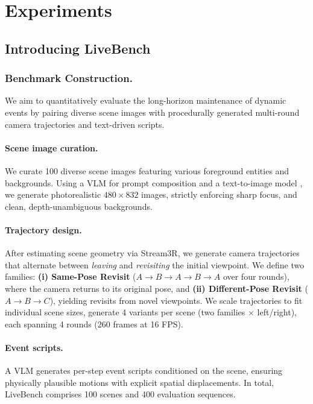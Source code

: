\vspace{-1mm}
\section{Experiments}
\subsection{Introducing LiveBench}
\vspace{-0.5mm}
\subsubsection{Benchmark Construction.}
We aim to quantitatively evaluate the long-horizon maintenance of dynamic events by pairing diverse scene images with procedurally generated multi-round camera trajectories and text-driven scripts.
\vspace{-0.5mm}
\paragraph{Scene image curation.}
We curate 100 diverse scene images featuring various foreground entities and backgrounds. Using a VLM\cite{qwen3vl} for prompt composition and a text-to-image model \cite{qwenimage}, we generate photorealistic $480\times832$ images, strictly enforcing sharp focus, and clean, depth-unambiguous backgrounds.
\vspace{-0.5mm}
\paragraph{Trajectory design.}
After estimating scene geometry via Stream3R\cite{stream3r2025}, we generate camera trajectories that alternate between \emph{leaving} and \emph{revisiting} the initial viewpoint. We define two families: \textbf{(i) Same-Pose Revisit} ($A \to B \to A \to B \to A$ over four rounds), where the camera returns to its original pose, and \textbf{(ii) Different-Pose Revisit} ($A \to B \to C$), yielding revisits from novel viewpoints. We scale trajectories to fit individual scene sizes, generate 4 variants per scene (two families $\times$ left/right), each spanning 4 rounds (260 frames at 16 FPS).
\paragraph{Event scripts.}
A VLM generates per-step event scripts conditioned on the scene, ensuring physically plausible motions with explicit spatial displacements. In total, LiveBench comprises 100 scenes and 400 evaluation sequences.

